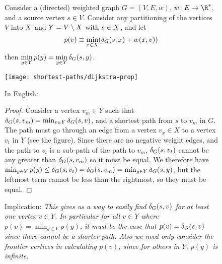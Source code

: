 \begin{figure}
\begin{lemma} \label{lem:sp::djk}
  Consider a (directed) weighted graph $G = (V,E, w)$, $w\!: E \to \R^*$, and a source vertex $s \in V$.  
Consider any partitioning of the vertices $V$ into $X$ and
$Y = V \setminus X$ with $s \in X$,  and let
\[p(v) \equiv \min_{x \in X} (\delta_G(s,x) + w(x,v))\]
then $\displaystyle \min_{y \in Y} p(y) = \min_{y \in Y} \delta_G(s, y)$.
\vspace{-.2in}
\begin{center}
  \texttt{[image: shortest-paths/dijkstra-prop]}
\end{center}

In English: 
\begin{proof}
  Consider a vertex $v_m \in Y$ such that $\delta_G(s,v_m) = \min_{v
    \in Y} \delta_G(s, v)$, and a shortest path from $s$ to $v_m$ in
  $G$.  The path must go through an edge from a vertex $v_x \in X$ to
  a vertex $v_t$ in $Y$ (see the figure).  Since there are no negative
  weight edges, and the path to $v_t$ is a sub-path of the path to
  $v_m$, $\delta_G(s,v_t)$ cannot be any greater than $\delta_G(s,v_m)$
  so it must be equal.  We therefore have $ \min_{y \in Y} p(y) \leq \delta_G(s,v_t) = \delta_G(s,v_m) =\min_{y \in Y} \delta_G(s, y)$, but the leftmost term cannot
  be less than the rightmost, so they must be equal.
\begin{comment}
  The path must cross from $X$ to $Y$ at some point using some
  edge $(v_X,v_T)$. Since sub-paths of shortest paths are shortest
  paths, the sub-path from $s$ to $v_T$ is a shortest path to $v_T$
  and, since edges are non-negative, path weights do not decrease along
  the path implying $\dist_G(s,v_T) \leq \dist_G(s,v_m)$ (it could
  be that $v_T = v_m$).  Furthermore $\min_{x \in X} (\dist_G(s,x) +
  w(x,v_T)) = \dist_G(s,v_T)$ by assumption, which gives the desired
  result since:
\[
d_{XY} \leq \min_{x \in X} (\dist_G(s,x) + w(x,v_t)) = \dist_G(s,v_t) \leq \dist_G(s,v_m)
= \min_{y \in Y} \dist_G(s, y)\, .\]
and
\[d_{XY} \geq \min_{y \in Y} \dist_G(s, y)\, ,\]
since $d_{XY}$ are path weights to $Y$ and the right hand side is the
overall shortest path to $Y$, so together we have an equality.
\end{comment}
\end{proof}
Implication: \emph{ This gives us a way to easily find $\delta_G(s,v)$
  for at least one vertex $v \in Y$.  In particular for all $v \in Y$
  where $p(v) = \min_{y \in Y} p(y)$, it must be the case that $p(v) =
  \delta_G(s,v)$ since there cannot be a shorter path.  Also we need
  only consider the frontier vertices in calculating $p(v)$,
  since for others in $Y$, $p(y)$ is infinite.  }
\end{lemma}
\end{figure}

